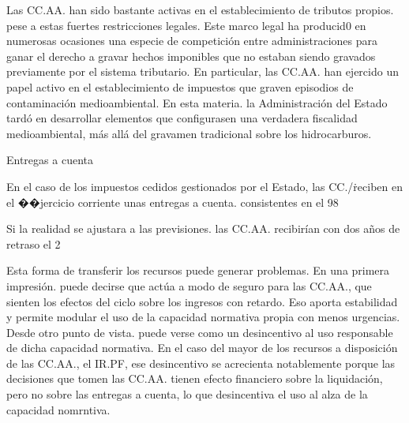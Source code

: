 \documentclass[10pt,a4paper]{article}
\begin{document}
{Las CC.AA. han sido bastante activas en el establecimiento de tributos propios. pese a estas fuertes restricciones legales. Este marco legal ha producid0 en numerosas ocasiones una especie de competición entre administraciones para ganar el derecho a gravar hechos imponibles que no estaban siendo gravados previamente por el sistema tributario. En particular, las CC.AA. han ejercido un papel activo en el establecimiento de impuestos que graven episodios de contaminación medioambiental. En esta materia. la Administración del Estado tardó en desarrollar elementos que configurasen una verdadera fiscalidad medioambiental, más allá del gravamen tradicional sobre los hidrocarburos.

Entregas a cuenta

En el caso de los impuestos cedidos gestionados por el Estado, las CC./\/\. reciben en el ��jercicio corriente unas entregas a cuenta. consistentes en el 98%

Si la realidad se ajustara a las previsiones. las CC.AA. recibirían con dos años de retraso el 2%

Esta forma de transferir los recursos puede generar problemas. En una primera impresión. puede decirse que actúa a modo de seguro para las CC.AA., que sienten los efectos del ciclo sobre los ingresos con retardo. Eso aporta estabilidad y permite modular el uso de la capacidad normativa propia con menos urgencias. Desde otro punto de vista. puede verse como un desincentivo al uso responsable de dicha capacidad normativa. En el caso del mayor de los recursos a disposición de las CC.AA., el IR.PF, ese desincentivo se acrecienta notablemente porque las decisiones que tomen las CC.AA. tienen efecto financiero sobre la liquidación, pero no sobre las entregas a cuenta, lo que desincentiva el uso al alza de la capacidad nomrntiva.

}
\end{document}
